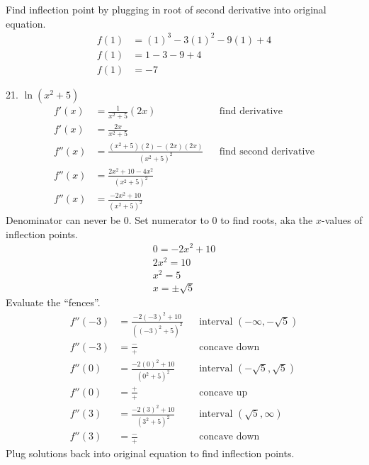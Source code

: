 \documentclass{article}
\begin{document}
\begin{description}
\begin{description}
                Find inflection point by plugging in root of second derivative into original equation.
                \begin{align*}
                  f(1) & = (1)^3-3(1)^2 - 9(1) + 4 \\
                  f(1) & = 1 - 3 - 9 + 4           \\
                  f(1) & = -7
                \end{align*}
          \item 21. $\ln{(x^2+5)}$
                \begin{align*}
                  f'(x)  & =  \frac{1}{x^2+5}(2x)                     &  & \text{find derivative}        \\
                  f'(x)  & =  \frac{2x}{x^2+5}                        &  &                               \\[2em]
                  f''(x) & =  \frac{(x^2+5)(2) - (2x)(2x)}{(x^2+5)^2} &  & \text{find second derivative} \\
                  f''(x) & =  \frac{2x^2+10 - 4x^2}{(x^2+5)^2}                                           \\
                  f''(x) & =  \frac{-2x^2 + 10}{(x^2+5)^2}
                \end{align*}
                Denominator can never be 0. Set numerator to 0 to find roots, aka the $x$-values of inflection points.
                \begin{align*}
                  0 = -2x^2 + 10 \\
                  2x^2 = 10      \\
                  x^2 = 5        \\
                  x = \pm \sqrt{5}
                \end{align*}
                Evaluate  the ``fences''.
                \begin{align*}
                  f''(-3) & =  \frac{-2(-3)^2 + 10}{((-3)^2+5)^2} &  & \text{interval $(-\infty, -\sqrt{5})$}  \\
                  f''(-3) & = \frac{-}{+}                         &  & \text{concave down}                     \\[2em]
                  f''(0)  & =  \frac{-2(0)^2 + 10}{(0^2+5)^2}     &  & \text{interval $(-\sqrt{5}, \sqrt{5})$} \\
                  f''(0)  & = \frac{+}{+}                         &  & \text{concave up}                       \\[2em]
                  f''(3)  & =  \frac{-2(3)^2 + 10}{(3^2+5)^2}     &  & \text{interval $(\sqrt{5}, \infty)$}    \\
                  f''(3)  & = \frac{-}{+}                         &  & \text{concave down}
                \end{align*}
                Plug solutions back into original equation to find inflection points.
        \end{description}
\end{description}
\end{document}
